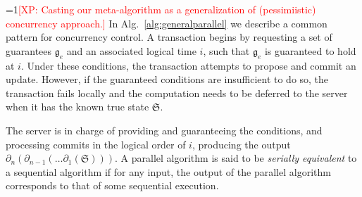 \documentclass{article} %
\newcommand{\Comments}{1}
\newcommand{\note}[2]{\ifnum\Comments=1\textcolor{#1}{#2}\fi}
\newcommand{\xinghao}[1]{\note{red}{[XP: #1]}}
\newcommand{\algref}[1]{Alg.~\ref{#1}}
\begin{document}



\xinghao{Casting our meta-algorithm as a generalization of (pessimiistic) concurrency approach.}
In \algref{alg:generalparallel} we describe a common pattern for concurrency control.
A transaction begins by requesting a set of guarantees $\mathfrak{g}_e$ and an associated logical time $i$, such that $\mathfrak{g}_e$ is guaranteed to hold at $i$.
Under these conditions, the transaction attempts to propose and commit an update.
However, if the guaranteed conditions are insufficient to do so, the transaction fails locally and the computation needs to be deferred to the server when it has the known true state $\mathfrak{S}$.

The server is in charge of providing and guaranteeing the conditions, and processing commits in the logical order of $i$, producing the output $\partial_n (\partial_{n-1}(\ldots \partial_1(\mathfrak{S})))$.
A parallel algorithm is said to be \textit{serially equivalent} to a sequential algorithm if for any input, the output of the parallel algorithm corresponds to that of some sequential execution.
\end{document}
